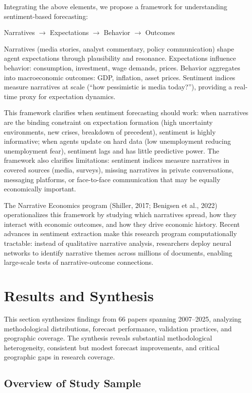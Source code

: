 \documentclass[11pt]{article}
\begin{document}
Integrating the above elements, we propose a framework for understanding sentiment-based forecasting:

\noindent
Narratives $\rightarrow$ Expectations $\rightarrow$ Behavior $\rightarrow$ Outcomes

Narratives (media stories, analyst commentary, policy communication) shape agent expectations through plausibility and resonance. Expectations influence behavior: consumption, investment, wage demands, prices. Behavior aggregates into macroeconomic outcomes: GDP, inflation, asset prices. Sentiment indices measure narratives at scale (``how pessimistic is media today?''), providing a real-time proxy for expectation dynamics.

This framework clarifies when sentiment forecasting should work: when narratives are the binding constraint on expectation formation (high uncertainty environments, new crises, breakdown of precedent), sentiment is highly informative; when agents update on hard data (low unemployment reducing unemployment fear), sentiment lags and has little predictive power. The framework also clarifies limitations: sentiment indices measure narratives in covered sources (media, surveys), missing narratives in private conversations, messaging platforms, or face-to-face communication that may be equally economically important.

The Narrative Economics program (Shiller, 2017; Benigsen et al., 2022) operationalizes this framework by studying which narratives spread, how they interact with economic outcomes, and how they drive economic history. Recent advances in sentiment extraction make this research program computationally tractable: instead of qualitative narrative analysis, researchers deploy neural networks to identify narrative themes across millions of documents, enabling large-scale tests of narrative-outcome connections.

\newpage
\section{Results and Synthesis}

This section synthesizes findings from 66 papers spanning 2007--2025, analyzing methodological distributions, forecast performance, validation practices, and geographic coverage. The synthesis reveals substantial methodological heterogeneity, consistent but modest forecast improvements, and critical geographic gaps in research coverage.

\subsection{Overview of Study Sample}
\end{document}
